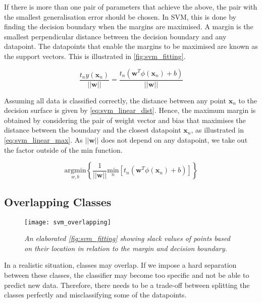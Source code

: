If there is more than one pair of parameters that achieve the above, the pair with the smallest generalisation error should be chosen. In SVM, this is done by finding the decision boundary when the margins are maximised. A margin is the smallest perpendicular distance between the decision boundary and any datapoint. The datapoints that enable the margins to be maximised are known as the support vectors. This is illustrated in \autoref{fig:svm_fitting}.

\begin{equation} \label{eq:svm_linear_dist}
  \frac{t_n y(\mathbf{x}_n)}{||\mathbf{w}||} = \frac{t_n (\mathbf{w}^T \phi(\mathbf{x}_n) + b)}{||\mathbf{w}||}
\end{equation}

Assuming all data is classified correctly, the distance between any point $\mathbf{x}_n$ to the decision surface is given by \autoref{eq:svm_linear_dist}. Hence, the maximum margin is obtained by considering the pair of weight vector and bias that maximises the distance between the boundary and the closest datapoint $\mathbf{x}_n$, as illustrated in \autoref{eq:svm_linear_max}. As $||\mathbf{w}||$ does not depend on any datapoint, we take out the factor outside of the $\mathrm{min}$ function. 

\begin{equation} \label{eq:svm_linear_max}
  \underset{w,b}{\mathrm{argmin}} \left \{ \frac{1}{||\mathbf{w}||} \underset{n}{\mathrm{min}} \left [ t_n \left (\mathbf{w}^T \phi \left (\mathbf{x}_n \right) + b \right) \right ] \right \} 
\end{equation}

\subsection{Overlapping Classes}

\begin{figure}[H]
  \centering
  \texttt{[image: svm\_overlapping]}
  \caption{\textit{An elaborated \autoref{fig:svm_fitting} showing slack values of points based on their location in relation to the margin and decision boundary.}}
  \label{fig:svm_overlapping}
\end{figure}
In a realistic situation, classes may overlap. If we impose a hard separation between these classes, the classifier may become too specific and not be able to predict new data. Therefore, there needs to be a trade-off between splitting the classes perfectly and misclassifying some of the datapoints. 

